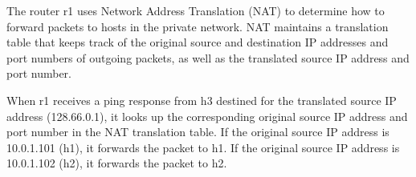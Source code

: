 The router r1 uses Network Address Translation (NAT) to determine how to forward packets to hosts in the private network. NAT maintains a translation table that keeps track of the original source and destination IP addresses and port numbers of outgoing packets, as well as the translated source IP address and port number.

When r1 receives a ping response from h3 destined for the translated source IP address (128.66.0.1), it looks up the corresponding original source IP address and port number in the NAT translation table. If the original source IP address is 10.0.1.101 (h1), it forwards the packet to h1. If the original source IP address is 10.0.1.102 (h2), it forwards the packet to h2.
